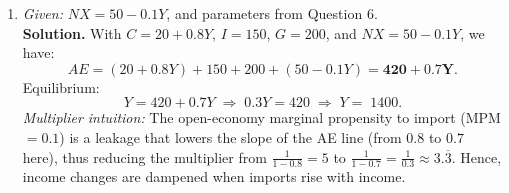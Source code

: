 \documentclass[12pt]{article}
\begin{document}
\begin{enumerate}[label=\textbf{ \arabic*.}, start=5, leftmargin=1.5em]
\vspace{0.75em}

\item \emph{Given:} $NX=50-0.1Y$, and parameters from Question 6. \\
\textbf{Solution.} With $C=20+0.8Y$, $I=150$, $G=200$, and $NX=50-0.1Y$, we have:
\[
AE = (20+0.8Y) + 150 + 200 + (50 - 0.1Y) = \mathbf{420 + 0.7Y}.
\]
Equilibrium:
\[
Y = 420 + 0.7Y \;\Rightarrow\; 0.3Y = 420 \;\Rightarrow\; \boxed{Y=\;1400}.
\]
\emph{Multiplier intuition:} The open-economy marginal propensity to import (MPM$=0.1$) is a leakage that lowers the slope of the AE line (from $0.8$ to $0.7$ here), thus reducing the multiplier from $\frac{1}{1-0.8}=5$ to $\frac{1}{1-0.7}=\frac{1}{0.3}\approx 3.\overline{3}$. Hence, income changes are dampened when imports rise with income.
\end{enumerate}
\end{document}
